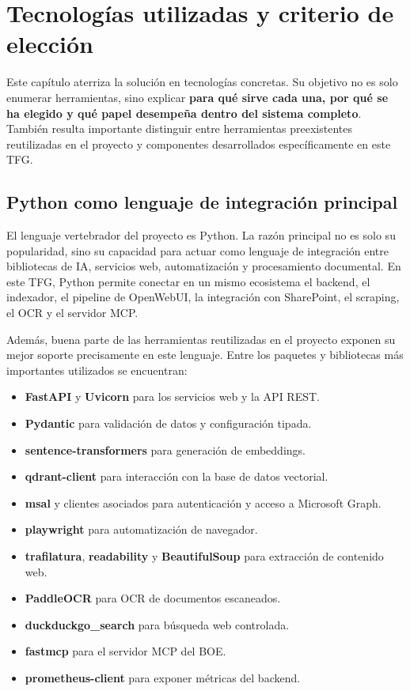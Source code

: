 \chapter{Tecnologías utilizadas y criterio de elección}
\label{cap:tecnologias}

Este capítulo aterriza la solución en tecnologías concretas. Su objetivo no es solo enumerar herramientas, sino explicar \textbf{para qué sirve cada una, por qué se ha elegido y qué papel desempeña dentro del sistema completo}. También resulta importante distinguir entre herramientas preexistentes reutilizadas en el proyecto y componentes desarrollados específicamente en este TFG.

\section{Python como lenguaje de integración principal}
\label{sec:python}

El lenguaje vertebrador del proyecto es Python. La razón principal no es solo su popularidad, sino su capacidad para actuar como lenguaje de integración entre bibliotecas de IA, servicios web, automatización y procesamiento documental. En este TFG, Python permite conectar en un mismo ecosistema el backend, el indexador, el pipeline de OpenWebUI, la integración con SharePoint, el scraping, el OCR y el servidor MCP.

Además, buena parte de las herramientas reutilizadas en el proyecto exponen su mejor soporte precisamente en este lenguaje. Entre los paquetes y bibliotecas más importantes utilizados se encuentran:

\begin{itemize}
    \item \textbf{FastAPI} y \textbf{Uvicorn} para los servicios web y la API REST.
    \item \textbf{Pydantic} para validación de datos y configuración tipada.
    \item \textbf{sentence-transformers} para generación de embeddings.
    \item \textbf{qdrant-client} para interacción con la base de datos vectorial.
    \item \textbf{msal} y clientes asociados para autenticación y acceso a Microsoft Graph.
    \item \textbf{playwright} para automatización de navegador.
    \item \textbf{trafilatura}, \textbf{readability} y \textbf{BeautifulSoup} para extracción de contenido web.
    \item \textbf{PaddleOCR} para OCR de documentos escaneados.
    \item \textbf{duckduckgo\_search} para búsqueda web controlada.
    \item \textbf{fastmcp} para el servidor MCP del BOE.
    \item \textbf{prometheus-client} para exponer métricas del backend.
\end{itemize}

